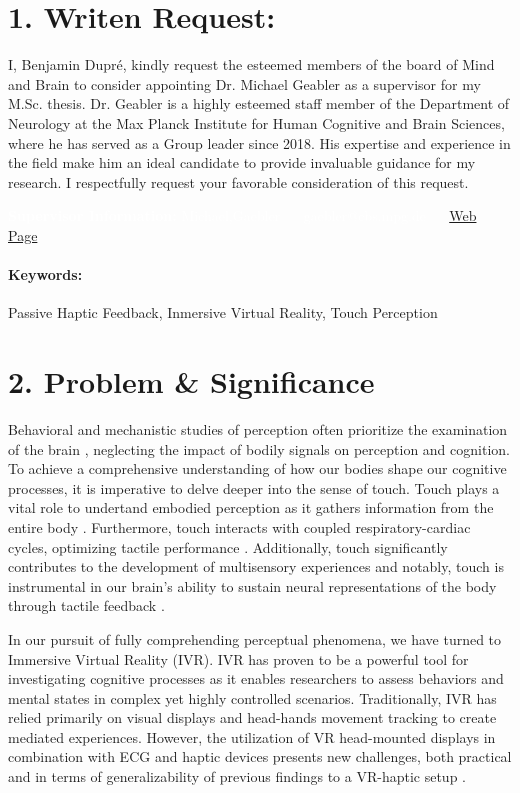 \documentclass[12pt,oneside,openright]{report}
\makeatletter
\newcommand{\supervisor}{Michael,Gaebler --- gaebler@cbs.mpg.de --- \href{https://www.cbs.mpg.de/person/gaebler/371395}{Web Page}.

}
\newcommand{\skills}{Passive Haptic Feedback, Inmersive Virtual Reality, Touch Perception}
\makeatother
\begin{document}
\section*{1. Writen Request:}
I, Benjamin Dupré, kindly request the esteemed members of the board of Mind and Brain to consider appointing Dr. Michael Geabler as a supervisor for my M.Sc. thesis. Dr. Geabler is a highly esteemed staff member of the Department of Neurology at the Max Planck Institute for Human Cognitive and Brain Sciences, where he has served as a Group leader since 2018. His expertise and experience in the field make him an ideal candidate to provide invaluable guidance for my research. I respectfully request your favorable consideration of this request.

\vspace*{0,5cm}

{\colorbox{boxcl}{\parbox[b][][r]{0.85\textwidth}{\textcolor{white}{\textbf{Supervisor Information:} \supervisor}}}}

\paragraph{\textbf{Keywords:}}\skills{}


\section*{2. Problem \& Significance}

Behavioral and mechanistic studies of perception often prioritize the examination of the brain \cite{Hofmann2021}, neglecting the impact of bodily signals on perception and cognition. To achieve a comprehensive understanding of how our bodies shape our cognitive processes, it is imperative to delve deeper into the sense of touch. Touch plays a vital role to undertand embodied perception as it gathers information from the entire body \cite*{Field2014}.  Furthermore, touch interacts with coupled respiratory-cardiac cycles, optimizing tactile performance \cite{Grund643}.  Additionally, touch significantly contributes to the development of multisensory experiences \cite{BREMNER2017227} and notably, touch is instrumental in our brain's ability to sustain neural representations of the body through tactile feedback \cite{Cole2016}.

In our pursuit of fully comprehending perceptual phenomena, we have turned to Immersive Virtual Reality (IVR). IVR has proven to be a powerful tool for investigating cognitive processes as it enables researchers to assess behaviors and mental states in complex yet highly controlled scenarios. Traditionally, IVR has relied primarily on visual displays and head-hands movement tracking to create mediated experiences. However, the utilization of VR head-mounted displays in combination with ECG and haptic devices presents new challenges, both practical and in terms of generalizability of previous findings to a VR-haptic setup \cite*{Klotzsche2023}.
\end{document}
